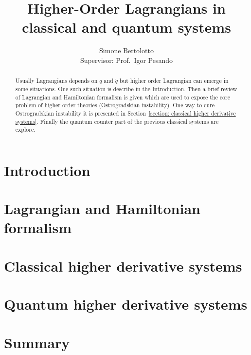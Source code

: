 \documentclass[a4paper]{article}
\title{Higher-Order Lagrangians in classical and quantum systems}
\author{Simone Bertolotto\\[1.0em]{\small Supervisor: Prof.\ Igor Pesando}}
\theoremstyle{definition}
\numberwithin{equation}{section}
\begin{document}
  \maketitle

  \begin{abstract}
    Usually Lagrangians depends on $q$ and $\dot{q}$ but higher order Lagrangian
    can emerge in some situations. One such situation is describe in the
    Introduction. Then a brief review of Lagrangian and Hamiltonian formalism
    is given which are used to expose the core problem of higher order
    theories (Ostrogradskian instability). One way to cure Ostrogradskian
    instability it is presented in Section~\ref{section: classical higher
    derivative systems}. Finally the quantum counter part of the
    previous classical systems are explore.
  \end{abstract}

  \newpage

  \section{Introduction}\label{section: introduction}
  

  \section{Lagrangian and Hamiltonian formalism}\label{section: lagrangin and
  hamiltonian formalism}
  

  \section{Classical higher derivative systems}\label{section: classical higher
  derivative systems}
  

  \section{Quantum higher derivative systems}\label{section: quantum higher
  derivative systems}
  

  \section{Summary}\label{section: summary}
  

  \newpage
\end{document}

